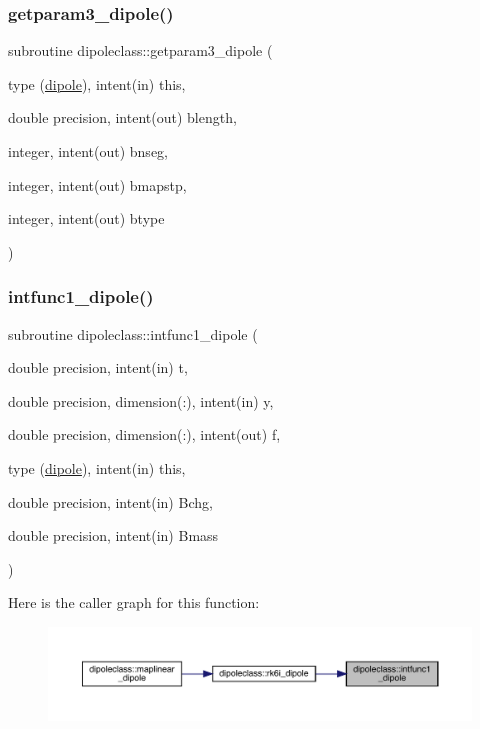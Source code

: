 \subsubsection{\texorpdfstring{getparam3\_dipole()}{getparam3\_dipole()}}
{\footnotesize\ttfamily subroutine dipoleclass\+::getparam3\+\_\+dipole (\begin{DoxyParamCaption}\item[{type (\mbox{\hyperlink{namespacedipoleclass_structdipoleclass_1_1dipole}{dipole}}), intent(in)}]{this,  }\item[{double precision, intent(out)}]{blength,  }\item[{integer, intent(out)}]{bnseg,  }\item[{integer, intent(out)}]{bmapstp,  }\item[{integer, intent(out)}]{btype }\end{DoxyParamCaption})}

\mbox{\label{namespacedipoleclass_ab15f3a0defc0de419f5613659abc9cad}} 
\subsubsection{\texorpdfstring{intfunc1\_dipole()}{intfunc1\_dipole()}}
{\footnotesize\ttfamily subroutine dipoleclass\+::intfunc1\+\_\+dipole (\begin{DoxyParamCaption}\item[{double precision, intent(in)}]{t,  }\item[{double precision, dimension(\+:), intent(in)}]{y,  }\item[{double precision, dimension(\+:), intent(out)}]{f,  }\item[{type (\mbox{\hyperlink{namespacedipoleclass_structdipoleclass_1_1dipole}{dipole}}), intent(in)}]{this,  }\item[{double precision, intent(in)}]{Bchg,  }\item[{double precision, intent(in)}]{Bmass }\end{DoxyParamCaption})}

Here is the caller graph for this function\+:\nopagebreak
\begin{figure}[H]
\begin{center}
\leavevmode
\includegraphics[width=350pt]{namespacedipoleclass_ab15f3a0defc0de419f5613659abc9cad_icgraph}
\end{center}
\end{figure}
\mbox{\label{namespacedipoleclass_a3388afe517788e8b824b96bf49793510}} 
